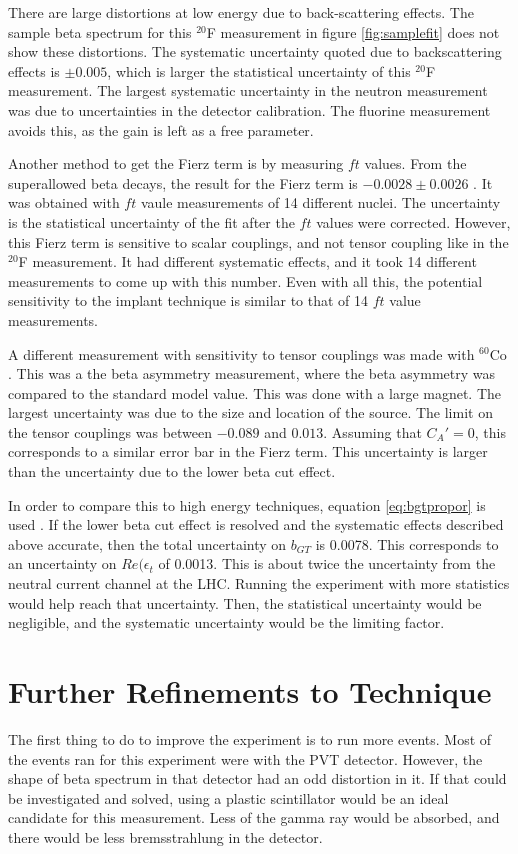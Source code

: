\documentclass[../MaxHughesThesis.tex]{subfiles}
\begin{document}
There are large distortions at low energy due to back-scattering effects. 
The sample beta spectrum for this $^{20}$F measurement in figure \ref{fig:samplefit} does not show these distortions.
The systematic uncertainty quoted due to backscattering effects is $\pm 0.005$, which is larger the statistical uncertainty of this $^{20}$F measurement.
The largest systematic uncertainty in the neutron measurement was due to uncertainties in the detector calibration.
The fluorine measurement avoids this, as the gain is left as a free parameter.

Another method to get the Fierz term is by measuring $ft$ values.
From the superallowed beta decays, the result for the Fierz term is $-0.0028 \pm 0.0026$ \cite{Har17}.
It was obtained with $ft$ vaule measurements of 14 different nuclei. 
The uncertainty is the statistical uncertainty of the fit after the $ft$ values were corrected.
However, this Fierz term is sensitive to scalar couplings, and not tensor coupling like in the $^{20}$F measurement.
It had different systematic effects, and it took 14 different measurements to come up with this number.
Even with all this, the potential sensitivity to the implant technique is similar to that of 14 $ft$ value measurements.

A different measurement with sensitivity to tensor couplings was made with $^{60}$Co \cite{Wau10}.
This was a the beta asymmetry measurement, where the beta asymmetry was compared to the standard model value.
This was done with a large magnet. 
The largest uncertainty was due to the size and location of the source.
The limit on the tensor couplings was between $-0.089$ and $0.013$.
Assuming that $C_{A}' = 0$, this corresponds to a similar error bar in the Fierz term.
This uncertainty is larger than the uncertainty due to the lower beta cut effect.

In order to compare this to high energy techniques, equation \ref{eq:bgtpropor} is used \cite{Gon19}.
If the lower beta cut effect is resolved and the systematic effects described above accurate, then the total uncertainty on $b_{GT}$ is 0.0078. 
This corresponds to an uncertainty on $Re(\epsilon_{t}$ of 0.0013.
This is about twice the uncertainty from the neutral current channel at the LHC. 
Running the experiment with more statistics would help reach that uncertainty.
Then, the statistical uncertainty would be negligible, and the systematic uncertainty would be the limiting factor. 

\section{Further Refinements to Technique}
The first thing to do to improve the experiment is to run more events.
Most of the events ran for this experiment were with the PVT detector.
However, the shape of beta spectrum in that detector had an odd distortion in it.
If that could be investigated and solved, using a plastic scintillator would be an ideal candidate for this measurement.
Less of the gamma ray would be absorbed, and there would be less bremsstrahlung in the detector.
\end{document}
